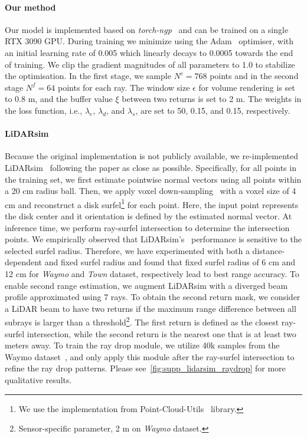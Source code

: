 \paragraph{Our method}
Our model is implemented based on \emph{torch-ngp}~\cite{torch-ngp,muller2022instant} and can be trained on a single RTX 3090 GPU. During training we minimize  using the Adam~\cite{kingma2014adam} optimiser, with an initial learning rate of 0.005 which linearly decays to 0.0005 towards the end of training. We clip the gradient magnitudes of all parameters to 1.0 to stabilize the optimisation. In the first stage, we sample $N^c = 768$ points and in the second stage $N^f=64$ points for each ray. The window size $\epsilon$ for volume rendering is set to 0.8 m, and the buffer value $\xi$ between two returns is set to 2 m. The weights in the loss function, i.e., $\lambda_e$, $\lambda_d$, and $\lambda_s$, are set to 50, 0.15, and 0.15, respectively.



\paragraph{LiDARsim}
Because the original implementation is not publicly available, we re-implemented LiDARsim~\cite{manivasagam2020lidarsim} following the paper as close as possible. Specifically, for all points in the training set, we first estimate pointwise normal vectors using all points within a 20 cm radius ball. Then, we apply voxel down-sampling~\cite{tang2022torchsparse} with a voxel size of 4 cm and reconstruct a disk surfel\footnote{We use the implementation from Point-Cloud-Utils~\cite{point-cloud-utils} library.} for each point. Here, the input point represents the disk center and it orientation is defined by the estimated normal vector. At inference time, we perform ray-surfel intersection to determine the intersection points. We empirically observed that LiDARsim's~\cite{manivasagam2020lidarsim} performance is sensitive to the selected surfel radius. Therefore, we have experimented with both a distance-dependent and fixed surfel radius and found that fixed surfel radius of 6 cm and 12 cm for \textit{Waymo} and \textit{Town} dataset, respectively lead to best range accuracy. To enable second range estimation, we augment LiDARsim with a diverged beam profile approximated using 7 rays. To obtain the second return mask, we consider a LiDAR beam to have two returns if the maximum range difference between all subrays is larger than a threshold\footnote{Sensor-specific parameter, 2 m on \textit{Waymo} dataset.}. The first return is defined as the closest ray-surfel intersection, while the second return is the nearest one that is at least two meters away. To train the ray drop module, we utilize 40k samples from the Waymo dataset~\cite{sun2020scalability}, and only apply this module after the ray-surfel intersection to refine the ray drop patterns. Please see~\cref{fig:supp_lidarsim_raydrop} for more qualitative results. 


